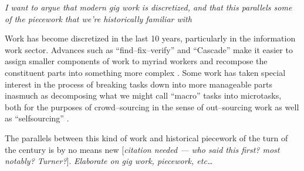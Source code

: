 \documentclass{sigchi}
\begin{document}








\textit{I want to argue that modern gig work is discretized,
and that this parallels some of the piecework that we're historically familiar with}

Work has become discretized in the last 10 years, particularly in the information work sector.
Advances such as
``find--fix--verify'' %
and
``Cascade'' %
make it easier to assign smaller components of work to myriad workers and
recompose the constituent parts into something more complex
\cite{bernstein2015soylent,chilton2013cascade}.
Some work has taken special interest in the process of breaking tasks down into more manageable parts
inasmuch as decomposing what we might call ``macro'' tasks into microtasks,
both for the purposes of crowd--sourcing in the sense of out--sourcing work
as well as ``selfsourcing''
\cite{cheng2015break,teevan2014selfsourcing}.

The parallels between this kind of work and
historical piecework of the turn of the  century
is by no means new
[\textit{citation needed --- who said this first? most notably? Turner?}].
\textit{Elaborate on gig work, piecework, etc\dots}
\end{document}
